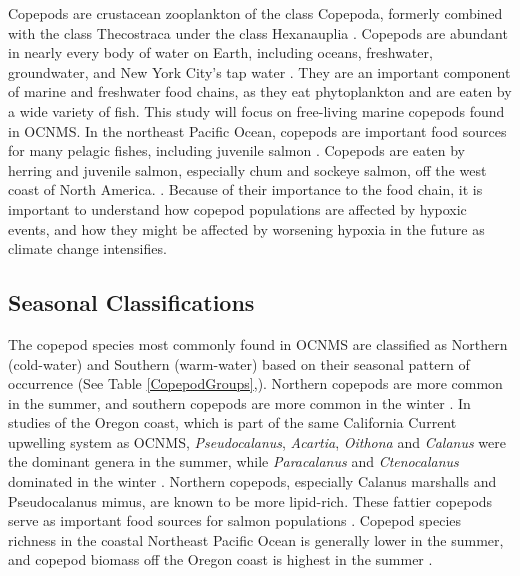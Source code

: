 \documentclass[12pt,twoside]{reedthesis}
\begin{document}
{Copepods are crustacean zooplankton of the class Copepoda, formerly combined with the class Thecostraca under the class Hexanauplia \autocite{Oakley2013, Lozano-Fernandez2019}. Copepods are abundant in nearly every body of water on Earth, including oceans, freshwater, groundwater, and New York City's tap water \autocite{Vakati2023, Berger2004}. They are an important component of marine and freshwater food chains, as they eat phytoplankton and are eaten by a wide variety of fish. This study will focus on free-living marine copepods found in OCNMS. In the northeast Pacific Ocean, copepods are important food sources for many pelagic fishes, including juvenile salmon \autocite{Brodeur1990}. Copepods are eaten by herring and juvenile salmon, especially chum and sockeye salmon, off the west coast of North America. \autocite{Brodeur1990, Friedenberg2012}. Because of their importance to the food chain, it is important to understand how copepod populations are affected by hypoxic events, and how they might be affected by worsening hypoxia in the future as climate change intensifies. 

\subsection{Seasonal Classifications}

The copepod species most commonly found in OCNMS are classified as Northern (cold-water) and Southern (warm-water) based on their seasonal pattern of occurrence (See Table \ref{CopepodGroups},\autocite{NOAAFisheries2024, Peterson2003, Peterson1977}). Northern copepods are more common in the summer, and southern copepods are more common in the winter \autocite{NOAAFisheries2024}.  In studies of the Oregon coast, which is part of the same California Current upwelling system as OCNMS, \textit{Pseudocalanus}, \textit{Acartia}, \textit{Oithona} and \textit{Calanus} were the dominant genera in the summer, while \textit{Paracalanus} and \textit{Ctenocalanus} dominated in the winter \autocite{Peterson1977, Peterson2003}. Northern copepods, especially Calanus marshalls and Pseudocalanus mimus, are known to be more lipid-rich. These fattier copepods serve as important food sources for salmon populations \autocite{NOAAFisheries2024}. Copepod species richness in the coastal Northeast Pacific Ocean is generally lower in the summer, and copepod biomass off the Oregon coast is highest in the summer \autocite{Peterson2003}. 

\begin{table}[!h] 
	

\end{table}}
\end{document}
